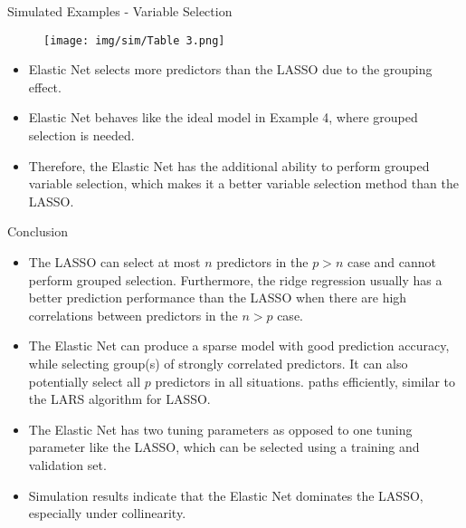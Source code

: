     \begin{frame}{Simulated Examples - Variable Selection}
        \begin{figure}
            \centering
            \texttt{[image: img/sim/Table 3.png]}
            \label{fig:enter-label}
        \end{figure}
        \begin{itemize}
            \item Elastic Net selects more predictors than the LASSO due to the grouping effect. 
            \item Elastic Net behaves like the ideal model in Example 4, where grouped selection is needed.
            \item Therefore, the Elastic Net has the additional ability to perform grouped variable selection, which makes it a better variable selection method than the LASSO.

        \end{itemize}
    \end{frame}
    \begin{frame}{Conclusion}
    \begin{itemize}
        \item The LASSO can select at most $n$ predictors in the $p>n$ case and cannot perform grouped selection. Furthermore, the ridge regression usually has a better prediction performance than the LASSO when there are high correlations between predictors in the $n>p$ case.
        \item The Elastic Net can produce a sparse model with good prediction accuracy, while
 selecting group(s) of strongly correlated predictors. It can also potentially select all $p$
 predictors in all situations.
 paths efficiently, similar to the LARS algorithm for LASSO.
        \item The Elastic Net has two tuning parameters as opposed to one tuning parameter like the LASSO, which can be selected using a training and validation set.
        \item Simulation results indicate that the Elastic Net dominates the LASSO, especially
 under collinearity.
    \end{itemize}
        
    \end{frame}


